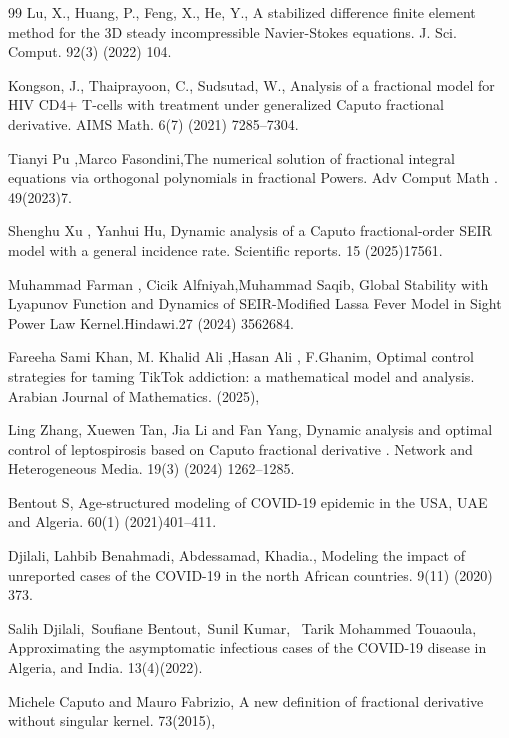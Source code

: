 \documentclass[10pt]{NSP1}
\begin{document}
\begin{thebibliography}{99}
Lu, X., Huang, P., Feng, X., He, Y., A stabilized difference finite element method for the 3D steady incompressible Navier-Stokes equations. J. Sci. Comput. 92(3) (2022) 104.

Kongson, J., Thaiprayoon, C., Sudsutad, W., Analysis of a fractional model for HIV CD4+ T-cells with treatment under generalized Caputo fractional derivative. AIMS Math. 6(7) (2021) 7285–7304.

Tianyi Pu ,Marco Fasondini,The numerical solution of fractional integral equations via orthogonal polynomials in fractional Powers. Adv Comput Math . 49(2023)7.

Shenghu Xu , Yanhui Hu, Dynamic analysis of a Caputo fractional-order SEIR model with a general incidence rate. Scientific reports. 15 (2025)17561.

Muhammad Farman , Cicik Alfniyah,Muhammad Saqib, Global Stability with Lyapunov Function and Dynamics of SEIR-Modified Lassa Fever Model in Sight Power Law Kernel.Hindawi.27 (2024) 3562684.

Fareeha Sami Khan, M. Khalid Ali ,Hasan Ali , F.Ghanim, Optimal control strategies for taming TikTok addiction: a mathematical model and analysis. Arabian Journal of Mathematics. (2025),

Ling Zhang, Xuewen Tan, Jia Li and Fan Yang, Dynamic analysis and optimal control of leptospirosis based on Caputo fractional derivative . Network and Heterogeneous Media. 19(3) (2024) 1262–1285.

Bentout S, Age-structured modeling of COVID-19 epidemic in the USA, UAE and Algeria. 60(1) (2021)401–411.

Djilali, Lahbib Benahmadi, Abdessamad, Khadia., Modeling the impact of unreported cases of the COVID-19 in the north African countries. 9(11) (2020) 373.

Salih Djilali, Soufiane Bentout, Sunil Kumar,  Tarik Mohammed Touaoula, Approximating the asymptomatic infectious cases of the COVID-19 disease in Algeria, and India. 13(4)(2022).

Michele Caputo and Mauro Fabrizio, A new deﬁnition of fractional derivative without singular kernel. 73(2015),

\end{thebibliography}
\end{document}
